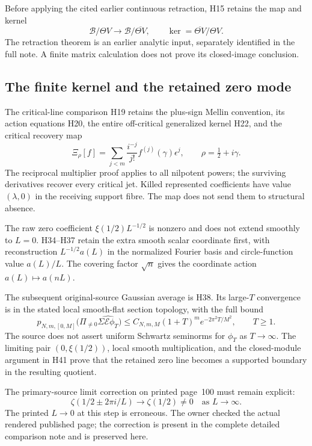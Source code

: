 \documentclass{article}
\begin{document}
Before applying the cited earlier continuous retraction, H15 retains
the map and kernel
\[
 \mathscr B/\Theta V\longrightarrow
 \mathscr B/\overline{\Theta V},\qquad
 \ker=\overline{\Theta V}/\Theta V.
\]
The retraction theorem is an earlier analytic input, separately
identified in the full note. A finite matrix calculation does not
prove its closed-image conclusion.

\subsection{The finite kernel and the retained zero mode}

The critical-line comparison H19 retains the plus-sign Mellin
convention, its action equations H20, the entire off-critical
generalized kernel H22, and the critical recovery map
\[
 \Xi_\rho[f]=\sum_{j<m}\frac{i^{-j}}{j!}
 f^{(j)}(\gamma)\epsilon^j,
 \qquad\rho=\tfrac12+i\gamma.
\]
The reciprocal multiplier proof applies to all nilpotent powers;
the surviving derivatives recover every critical jet.
Killed represented coefficients have value $(\lambda,0)$ in
the receiving support fibre. The map does not send them to
structural absence.

The raw zero coefficient $\xi(1/2)L^{-1/2}$ is nonzero and does
not extend smoothly to $L=0$. H34--H37 retain the extra smooth
scalar coordinate first, with reconstruction $L^{-1/2}a(L)$ in
the normalized Fourier basis and circle-function value $a(L)/L$.
The covering factor $\sqrt n$ gives the coordinate action
$a(L)\mapsto a(nL)$.

The subsequent original-source Gaussian average is H38. Its
large-$T$ convergence is in the stated local smooth-flat section
topology, with the full bound
\[
 p_{N,m,[0,M]}
 \bigl(\Pi_{\ne0}\widehat{\Sigma\mathcal E\phi_T}\bigr)
 \le C_{N,m,M}(1+T)^m e^{-2\pi^2T/M^2},\qquad T\ge1.
\]
The source does not assert uniform Schwartz seminorms for
$\phi_T$ as $T\to\infty$. The limiting pair
$(0,\xi(1/2))$, local smooth multiplication, and the closed-module
argument in H41 prove that the retained zero line becomes a
supported boundary in the resulting quotient.

The primary-source limit correction on printed page~100 must
remain explicit:
\[
 \zeta(1/2\pm2\pi i/L)\longrightarrow\zeta(1/2)\ne0
 \quad\text{as }L\longrightarrow\infty.
\]
The printed $L\to0$ at this step is erroneous. The owner checked
the actual rendered published page; the correction is present in
the complete detailed comparison note and is preserved here.
\end{document}
